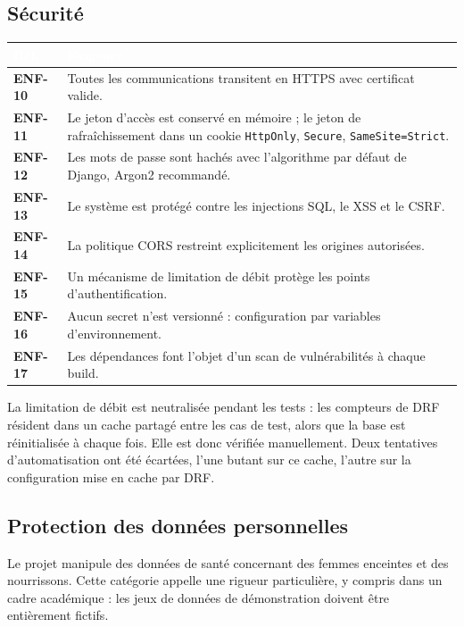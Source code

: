\documentclass[11pt,a4paper]{article}
\newcommand{\rid}[1]{{\sffamily\bfseries\footnotesize\color{primary}#1}}
\newcommand{\hd}[1]{\textcolor{white}{\sffamily\bfseries\small #1}}
\newcommand{\rowhead}{\rowcolor{primary}}
\begin{document}
\subsection{Sécurité}

\begin{xltabular}{\textwidth}{@{}C{1.7cm} L@{}}
\toprule
\rowhead \hd{Réf.} & \hd{Exigence} \\
\midrule \endhead
\rid{ENF-10} & Toutes les communications transitent en HTTPS avec certificat valide. \\
\rid{ENF-11} & Le jeton d'accès est conservé en mémoire ; le jeton de rafraîchissement dans un cookie \texttt{HttpOnly}, \texttt{Secure}, \texttt{SameSite=Strict}. \\
\rid{ENF-12} & Les mots de passe sont hachés avec l'algorithme par défaut de Django, Argon2 recommandé. \\
\rid{ENF-13} & Le système est protégé contre les injections SQL, le XSS et le CSRF. \\
\rid{ENF-14} & La politique CORS restreint explicitement les origines autorisées. \\
\rid{ENF-15} & Un mécanisme de limitation de débit protège les points d'authentification. \\
\rid{ENF-16} & Aucun secret n'est versionné : configuration par variables d'environnement. \\
\rid{ENF-17} & Les dépendances font l'objet d'un scan de vulnérabilités à chaque build. \\
\bottomrule
\end{xltabular}

\begin{vigilance}
La limitation de débit est neutralisée pendant les tests : les compteurs de
DRF résident dans un cache partagé entre les cas de test, alors que la base
est réinitialisée à chaque fois. Elle est donc vérifiée manuellement. Deux
tentatives d'automatisation ont été écartées, l'une butant sur ce cache,
l'autre sur la configuration mise en cache par DRF.
\end{vigilance}

\subsection{Protection des données personnelles}

\begin{vigilance}
Le projet manipule des données de santé concernant des femmes enceintes et des nourrissons.
Cette catégorie appelle une rigueur particulière, y compris dans un cadre académique :
les jeux de données de démonstration doivent être entièrement fictifs.
\end{vigilance}
\end{document}
